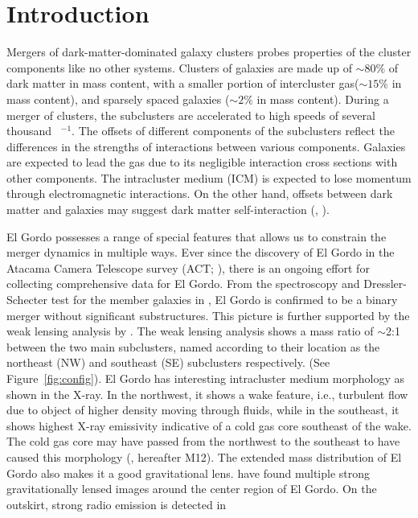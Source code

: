 \section{Introduction} 
Mergers of dark-matter-dominated galaxy clusters probes properties
of the cluster components like no other systems. 
Clusters of galaxies are made up of $\sim80\%$ of dark matter in mass content, 
with a smaller  portion of intercluster gas($\sim15\%$ in mass content), and
sparsely spaced galaxies ($\sim2\%$ in mass content). During a merger of
clusters, the subclusters are accelerated to high speeds of several
thousand \kilo \meter~\second$^{-1}$. The offsets of
different components of the subclusters reflect the differences in the
strengths of interactions between various components. Galaxies are
expected to lead the gas due to its negligible interaction cross
sections with other components. The intracluster medium (ICM) is expected to lose
momentum through electromagnetic interactions. On the other hand, offsets
between dark matter and galaxies may suggest dark matter self-interaction
(\citealt{Kahlhoefer14}, \citealt{Randall2008d}).  
\par
El Gordo possesses a range of special features that allows us to constrain
the merger dynamics in multiple ways.  Ever since the discovery of El Gordo
in the Atacama Camera Telescope survey (ACT; \citealt{Marriage11}), there is an ongoing effort for
collecting comprehensive data for El Gordo.
From the spectroscopy and Dressler-Schecter test for the member galaxies
in \cite{Sifon13}, El Gordo is confirmed to be a binary merger 
without significant substructures. This picture is further supported by the
weak lensing analysis by \cite{Jee13}. The weak lensing analysis shows
a mass ratio of $\sim$2:1  between the two main subclusters, named according to their location as the northeast (NW) and southeast (SE) subclusters respectively. 
(See Figure~\ref{fig:config}). El Gordo has interesting intracluster medium morphology as shown in the X-ray. In the northwest, it shows a wake feature, i.e.,
turbulent flow due to object of higher density moving through fluids, while in the southeast, it shows
highest X-ray emissivity indicative of a cold gas core southeast of the
wake. The cold gas core may have passed from the northwest to the southeast
to have caused this morphology (\citealt{M12}, hereafter M12). 
The extended mass distribution of El Gordo also makes it a good
gravitational lens. \cite{Zitrin13} have found multiple strong
gravitationally lensed images around the center region of El Gordo. 
On the outskirt, strong radio emission is detected in
